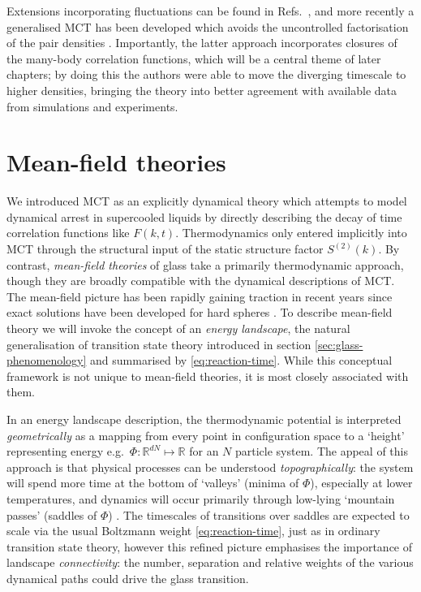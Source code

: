 \documentclass[11pt,twoside]{report}
\begin{document}
Extensions incorporating fluctuations can be found in Refs.\ \cite{BiroliPRL2006,SzamelPTEP2013}, and more recently a generalised MCT has been developed which avoids the uncontrolled factorisation of the pair densities \cite{JanssenPRL2015,JanssenFP2018}.
Importantly, the latter approach incorporates closures of the many-body correlation functions, which will be a central theme of later chapters; by doing this the authors were able to move the diverging timescale to higher densities, bringing the theory into better agreement with available data from simulations and experiments.

\section{Mean-field theories}
\label{sec:mean-field-glass}

We introduced MCT as an explicitly dynamical theory which attempts to model dynamical arrest in supercooled liquids by directly describing the decay of time correlation functions like $F(k, t)$.
Thermodynamics only entered implicitly into MCT through the structural input of the static structure factor $S^{(2)}(k)$.
By contrast, \emph{mean-field theories} of glass take a primarily thermodynamic approach, though they are broadly compatible with the dynamical descriptions of MCT.
The mean-field picture has been rapidly gaining traction in recent years since exact solutions have been developed for hard spheres \cite{ParisiRMP2010,KurchanJSM2012,KurchanJPCB2013,CharbonneauNC2014,CharbonneauJSM2014}.
To describe mean-field theory we will invoke the concept of an \emph{energy landscape}, the natural generalisation of transition state theory introduced in section \ref{sec:glass-phenomenology} and summarised by \eqref{eq:reaction-time}.
While this conceptual framework is not unique to mean-field theories, it is most closely associated with them.

In an energy landscape description, the thermodynamic potential is interpreted \emph{geometrically} as a mapping from every point in configuration space to a `height' representing energy e.g.\ $\Phi: \mathbb{R}^{dN} \mapsto \mathbb{R}$ for an $N$ particle system.
The appeal of this approach is that physical processes can be understood \emph{topographically}: the system will spend more time at the bottom of `valleys' (minima of $\Phi$), especially at lower temperatures, and dynamics will occur primarily through low-lying `mountain passes' (saddles of $\Phi$) \cite{StillingerS1995}.
The timescales of transitions over saddles are expected to scale via the usual Boltzmann weight \eqref{eq:reaction-time}, just as in ordinary transition state theory, however this refined picture emphasises the importance of landscape \emph{connectivity}: the number, separation and relative weights of the various dynamical paths could drive the glass transition.
\end{document}
